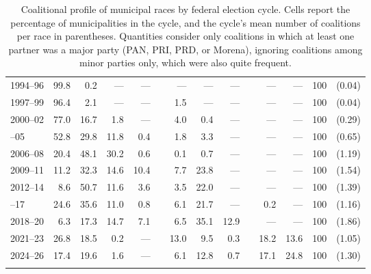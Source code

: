 \documentclass[letter,12pt]{article}
\begin{document}
\begin{table}
{\begin{tabular}{lrrrrrrrrrrrrc}
 1994--96&  99.8&   0.2&    ---&    ---&&    ---&       ---&         ---&&  ---&       ---& 100 & (0.04) \\
 1997--99&  96.4&   2.1&    ---&    ---&&    1.5&       ---&         ---&&  ---&       ---& 100 & (0.04) \\
 2000--02&  77.0&  16.7&    1.8&    ---&&    4.0&       0.4&         ---&&  ---&       ---& 100 & (0.29) \\ \hdashline
 2003--05&  52.8&  29.8&   11.8&    0.4&&    1.8&       3.3&         ---&&  ---&       ---& 100 & (0.65) \\
 2006--08&  20.4&  48.1&   30.2&    0.6&&    0.1&       0.7&         ---&&  ---&       ---& 100 & (1.19) \\
 2009--11&  11.2&  32.3&   14.6&   10.4&&    7.7&      23.8&         ---&&  ---&       ---& 100 & (1.54) \\
 2012--14&   8.6&  50.7&   11.6&    3.6&&    3.5&      22.0&         ---&&  ---&       ---& 100 & (1.39) \\ \hdashline
 2015--17&  24.6&  35.6&   11.0&    0.8&&    6.1&      21.7&         ---&&  0.2&       ---& 100 & (1.16) \\
 2018--20&   6.3&  17.3&   14.7&    7.1&&    6.5&      35.1&        12.9&&  ---&       ---& 100 & (1.86) \\
 2021--23&  26.8&  18.5&    0.2&    ---&&   13.0&       9.5&         0.3&& 18.2&      13.6& 100 & (1.05) \\
 2024--26&  17.4&  19.6&    1.6&    ---&&    6.1&      12.8&         0.7&& 17.1&      24.8& 100 & (1.30) \\ 
         &      &      &       &       &&       &          &            &&     &          &       &        \\ [-1.8ex] 
  \hline
\end{tabular}
}
\caption{Coalitional profile of municipal races by federal election cycle. Cells report the percentage of municipalities in the cycle, and the cycle's mean number of coalitions per race in parentheses. Quantities consider only coalitions in which at least one partner was a major party (PAN, PRI, PRD, or Morena), ignoring coalitions among minor parties only, which were also quite frequent.}\label{T:coal}
\end{table}
\end{document}
